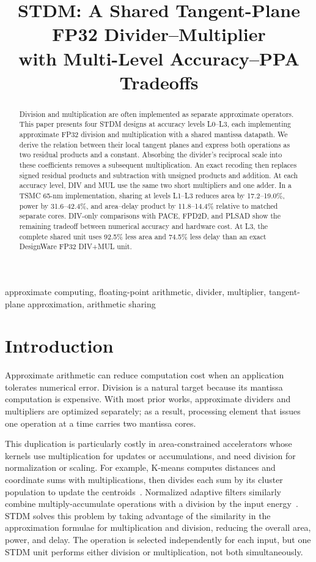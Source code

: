 \documentclass[conference]{IEEEtran}
\title{STDM: A Shared Tangent-Plane FP32 Divider--Multiplier\\
with Multi-Level Accuracy--PPA Tradeoffs}
\author{\IEEEauthorblockN{Pingchuan Dong}}
\begin{document}
\maketitle

\begin{abstract}
Division and multiplication are often implemented as separate approximate
operators. This paper presents four STDM designs at accuracy levels L0--L3, each implementing approximate FP32 division and multiplication with a shared mantissa datapath. We derive the relation between their local tangent planes
and express both operations as two residual products and a constant.
Absorbing the divider's reciprocal scale into these coefficients removes a
subsequent multiplication. An exact recoding then replaces signed residual
products and subtraction with unsigned products and addition. At each accuracy level, DIV and MUL use the same two short multipliers and one adder. In a TSMC 65-nm implementation, sharing at levels L1--L3 reduces area by
17.2--19.0\%, power by 31.6--42.4\%, and area--delay product by 11.8--14.4\%
relative to matched separate cores. DIV-only comparisons with PACE, FPD2D, and PLSAD show the remaining tradeoff
between numerical accuracy and hardware cost. At L3, the complete shared unit
uses 92.5\% less area and 74.5\% less delay than an exact DesignWare FP32
DIV+MUL unit.
\end{abstract}

\begin{IEEEkeywords}
approximate computing, floating-point arithmetic, divider, multiplier,
tangent-plane approximation, arithmetic sharing
\end{IEEEkeywords}

\section{Introduction}
Approximate arithmetic can reduce computation cost when an application
tolerates numerical error. Division is a natural target because its mantissa
computation is expensive. With most prior works, approximate dividers and multipliers are optimized separately; as a result, processing element that issues one operation at a time carries two mantissa cores.

This duplication is particularly costly in area-constrained accelerators whose kernels use multiplication for updates or accumulations, and need division for normalization or scaling. For example, K-means computes distances and coordinate sums with multiplications, then divides each sum by its cluster
population to update the centroids~\cite{chen2010kmeans}. Normalized adaptive
filters similarly combine multiply-accumulate operations with a division by
the input energy~\cite{yao2024nlms}. STDM solves this problem by taking advantage of the similarity in the approximation formulae for multiplication and division, reducing the overall area, power, and delay. The operation is selected independently for each input, but one STDM unit performs either division or multiplication, not both simultaneously.
\end{document}
